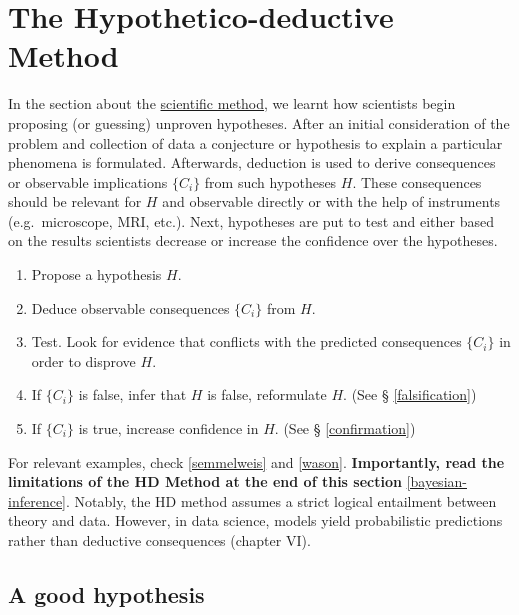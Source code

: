 \documentclass[
  12pt,
]{book}
\begin{document}
\section{The Hypothetico-deductive Method}\label{the-hypothetico-deductive-method}

In the section about the \hyperref[sci-method]{scientific method}, we learnt how scientists begin proposing (or guessing) unproven hypotheses. After an initial consideration of the problem and collection of data a conjecture or hypothesis to explain a particular phenomena is formulated. Afterwards, deduction is used to derive consequences or observable implications \(\{C_i\}\) from such hypotheses \(H\). These consequences should be relevant for \(H\) and observable directly or with the help of instruments (e.g.~microscope, MRI, etc.). Next, hypotheses are put to test and either based on the results scientists decrease or increase the confidence over the hypotheses.

\begin{enumerate}
\def\labelenumi{\arabic{enumi}.}
\item
  Propose a hypothesis \(H\).
\item
  Deduce observable consequences \(\{C_i\}\) from \(H\).
\item
  Test. Look for evidence that conflicts with the predicted consequences \(\{C_i\}\) in order to disprove \(H\).
\item
  If \(\{C_i\}\) is false, infer that \(H\) is false, reformulate \(H\). (See § \ref{falsification})
\item
  If \(\{C_i\}\) is true, increase confidence in \(H\). (See § \ref{confirmation})
\end{enumerate}

For relevant examples, check \ref{semmelweis} and \ref{wason}. \textbf{Importantly, read the limitations of the HD Method at the end of this section} \ref{bayesian-inference}. Notably, the HD method assumes a strict logical entailment between theory and data. However, in data science, models yield probabilistic predictions rather than deductive consequences \citep{mayo1996error} (chapter VI).

\subsection{A good hypothesis}\label{a-good-hypothesis}
\end{document}
